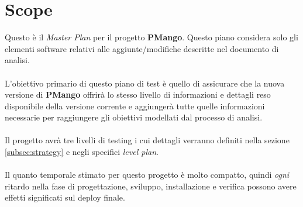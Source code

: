 \section{Scope}

Questo \`e il \emph{Master Plan} per il progetto \textbf{PMango}. Questo piano
considera solo gli elementi software relativi alle aggiunte/modifiche descritte
nel documento di analisi. \\ \\
L'obiettivo primario di questo piano di test \`e quello di assicurare che la
nuova versione di \textbf{PMango} offrir\`a lo stesso livello di informazioni e
dettagli reso disponibile della versione corrente e aggiunger\`a tutte quelle
informazioni necessarie per raggiungere gli obiettivi modellati dal processo di
analisi.
\\ \\
Il progetto avr\`a tre livelli di testing i cui dettagli verranno definiti
nella sezione \ref{subsec:strategy} e negli specifici \emph{level plan}. 
\\ \\ 
Il quanto temporale stimato per questo progetto \`e molto compatto, quindi
\emph{ogni} ritardo nella fase di progettazione, sviluppo, installazione e
verifica possono avere effetti significati sul deploy finale.

